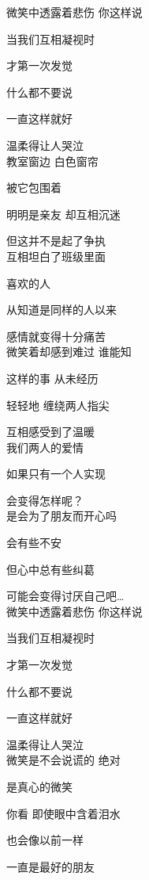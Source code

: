 微笑中透露着悲伤 你这样说

当我们互相凝视时

才第一次发觉

什么都不要说

一直这样就好

温柔得让人哭泣
\\

教室窗边 白色窗帘

被它包围着

明明是亲友 却互相沉迷

但这并不是起了争执
\\

互相坦白了班级里面

喜欢的人

从知道是同样的人以来

感情就变得十分痛苦
\\

微笑着却感到难过 谁能知

这样的事 从未经历

轻轻地 缠绕两人指尖

互相感受到了温暖
\\

我们两人的爱情

如果只有一个人实现

会变得怎样呢？
\\

是会为了朋友而开心吗

会有些不安

但心中总有些纠葛

可能会变得讨厌自己吧…
\\

微笑中透露着悲伤 你这样说

当我们互相凝视时

才第一次发觉

什么都不要说

一直这样就好

温柔得让人哭泣
\\

微笑是不会说谎的 绝对

是真心的微笑

你看 即使眼中含着泪水

也会像以前一样

一直是最好的朋友
\\
